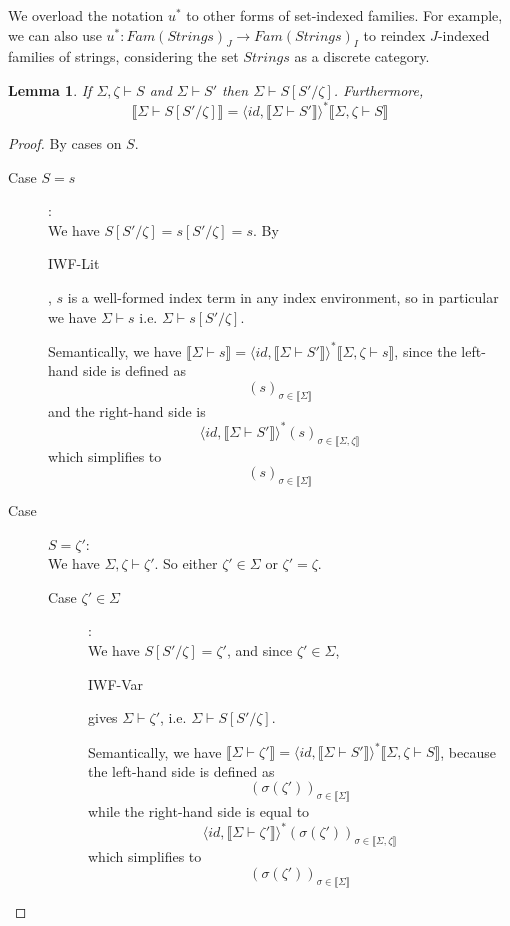 \documentclass{article}
\newtheorem{lemma}{Lemma}
\newcommand{\sem}[1]{\llbracket #1 \rrbracket}
\newcommand{\sdisp}[1]{
\left( #1 \right)
}
\begin{document}
We overload the notation $u^*$ to other forms of set-indexed families. For example, we can also use $u^* : \mathit{Fam}(\mathit{Strings})_J \to \mathit{Fam}(\mathit{Strings})_I$ to reindex $J$-indexed families of strings, considering the set $\mathit{Strings}$ as a discrete category. 

\begin{lemma}
If $\Sigma,\zeta \vdash S$ and $\Sigma \vdash S'$ then $\Sigma \vdash S[S'/\zeta]$. Furthermore, $$\sem{\Sigma \vdash S[S'/\zeta]} = \langle \mathit{id}, \sem{\Sigma \vdash S'} \rangle^* \sem{\Sigma,\zeta \vdash S}$$
\label{SWF-Subst}
\end{lemma}
\begin{proof}
By cases on $S$.

\begin{description}
\item[Case $S = s$]:\\
We have $S[S'/\zeta] = s[S'/\zeta] = s$. By \begin{sc}IWF-Lit\end{sc}, $s$ is a well-formed index term in any index environment, so in particular we have $\Sigma \vdash s$ i.e. $\Sigma \vdash s[S'/\zeta]$.

Semantically, we have $\sem{\Sigma \vdash s} = \langle \mathit{id}, \sem{\Sigma \vdash S'} \rangle^* \sem{\Sigma,\zeta \vdash s}$, since the left-hand side is defined as $$( s )_{\sigma \in \sem{\Sigma}}$$ and the right-hand side is $$\langle \mathit{id}, \sem{\Sigma \vdash S'} \rangle^* ( s )_{\sigma \in \sem{\Sigma,\zeta}}$$ which simplifies to $$ ( s )_{\sigma \in \sem{\Sigma}}$$

\item[Case ]$S = \zeta'$:\\
We have $\Sigma,\zeta \vdash \zeta'$. So either $\zeta' \in \Sigma$ or $\zeta' = \zeta$.

\begin{description}
\item[Case $\zeta' \in \Sigma$]:\\
We have $S[S'/\zeta] = \zeta'$, and since $\zeta' \in \Sigma$, \begin{sc}IWF-Var\end{sc} gives $\Sigma \vdash \zeta'$, i.e. $\Sigma \vdash S[S'/\zeta]$.

Semantically, we have $\sem{\Sigma \vdash \zeta'} = \langle \mathit{id}, \sem{\Sigma \vdash S'} \rangle^* \sem{\Sigma,\zeta \vdash S}$, because the left-hand side is defined as $$\sdisp{\sigma(\zeta')}_{\sigma \in \sem{\Sigma}}$$ while the right-hand side is equal to $$\langle \mathit{id}, \sem{\Sigma \vdash \zeta'} \rangle^* (\sigma(\zeta'))_{\sigma \in \sem{\Sigma,\zeta}}$$ which simplifies to $$(\sigma(\zeta'))_{\sigma \in \sem{\Sigma}}$$
 

\end{description}
\end{description}
\end{proof}
\end{document}
